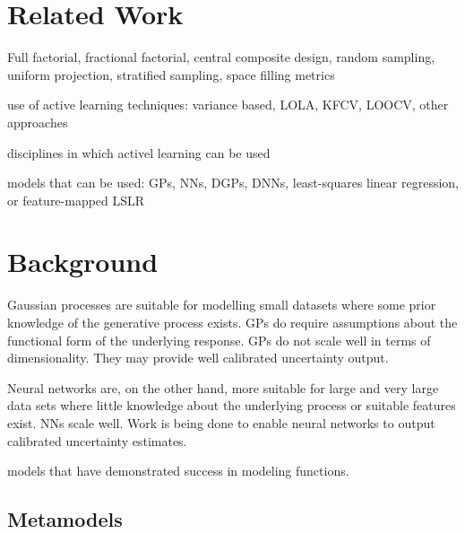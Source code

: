 \documentclass[conference]{IEEEtran}
\begin{document}
	
	
	
	
	\section{Related Work}
	\label{sec:related-work}
	
	Full factorial, fractional factorial, central composite design, random sampling, uniform projection, stratified sampling, space filling metrics
	
	use of active learning techniques: variance based, LOLA, KFCV, LOOCV, other approaches
	
	disciplines in which activel learning can be used
	
	models that can be used: GPs, NNs, DGPs, DNNs, least-squares linear regression, or feature-mapped LSLR
	
	\section{Background}
	\label{sec:background}
	
	Gaussian processes are suitable for modelling small datasets where some prior knowledge of the generative process exists. GPs do require assumptions about the functional form of the underlying response. GPs do not scale well in terms of dimensionality. They may provide well calibrated uncertainty output.

    Neural networks are, on the other hand, more suitable for large and very large data sets where little knowledge about the underlying process or suitable features exist. NNs scale well. Work is being done to enable neural networks to output calibrated uncertainty estimates.
    
    models that have demonstrated success in modeling functions.
    
    \subsection{Metamodels}
    
\end{document}
